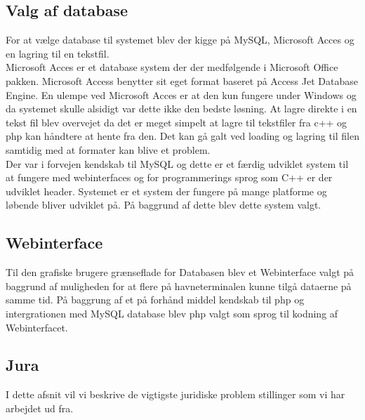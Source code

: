 \subsection{Valg af database}
For at vælge database til systemet blev der kigge på MySQL, Microsoft Acces og en lagring til en tekstfil.\\
Microsoft Acces er et database system der der medfølgende i Microsoft Office pakken. Microsoft Access benytter sit eget format baseret på Access Jet Database Engine. En ulempe ved Microsoft Acces er at den kun fungere under Windows og da systemet skulle alsidigt var dette ikke den bedste løsning. At lagre direkte i en tekst fil blev overvejet da det er meget simpelt at lagre til tekstfiler fra c++ og php kan håndtere at hente fra den. Det kan gå galt ved loading og lagring til filen samtidig med at formater kan blive et problem. \\
Der var i forvejen kendskab til MySQL og dette er et færdig udviklet system til at fungere med webinterfaces og for programmerings sprog som C++ er der udviklet header. Systemet er et system der fungere på mange platforme og løbende bliver udviklet på. På baggrund af dette blev dette system valgt.

\subsection{Webinterface}
Til den grafiske brugere grænseflade for Databasen blev et Webinterface valgt på baggrund af muligheden for at flere på havneterminalen kunne tilgå dataerne på samme tid. På baggrung af et på forhånd middel kendskab til php og intergrationen med MySQL database blev php valgt som sprog til kodning af Webinterfacet.

\subsection{Jura}
I dette afsnit vil vi beskrive de vigtigste juridiske problem stillinger som vi har arbejdet ud fra.


